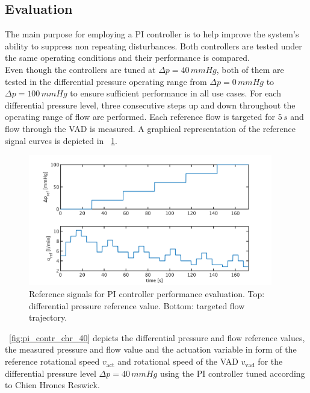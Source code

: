 \subsection{Evaluation}
The main purpose for employing a PI controller is to help improve the system's ability to suppress non repeating disturbances.
Both controllers are tested under the same operating conditions and their performance is compared.
\\Even though the controllers are tuned at $\Delta{p}=40\,mmHg$, both of them  are tested in the differential pressure operating range from $\Delta{p}=0\,mmHg$ to $\Delta{p}=100\,mmHg$ to ensure sufficient performance in all use cases.
For each differential pressure level, three consecutive steps up and down throughout the operating range of flow are performed. Each reference flow is targeted for $5\,s$ and flow through the VAD is measured. A graphical representation of the reference signal curves is depicted in \figurename~\ref{fig:PI_control_ref_signals}.
\begin{figure}[ht]
  \centering
  \includegraphics[width=0.95\textwidth]{images/chapt_5/PI_control_ref_signals.pdf}
  \caption[Reference signals for PI controller performance evaluation]{Reference signals for PI controller performance evaluation. Top: differential pressure reference value. Bottom: targeted flow trajectory.}
  \label{fig:PI_control_ref_signals}
\end{figure}
\figurename~\ref{fig:pi_contr_chr_40} depicts the differential pressure and flow reference values, the measured pressure and flow value and the actuation variable in form of the reference rotational speed $v_{\mathrm{act}}$ and rotational speed of the VAD $v_{\mathrm{vad}}$ for the differential pressure level $\Delta{p}=40\,mmHg$ using the PI controller tuned according to Chien Hrones Reswick.
